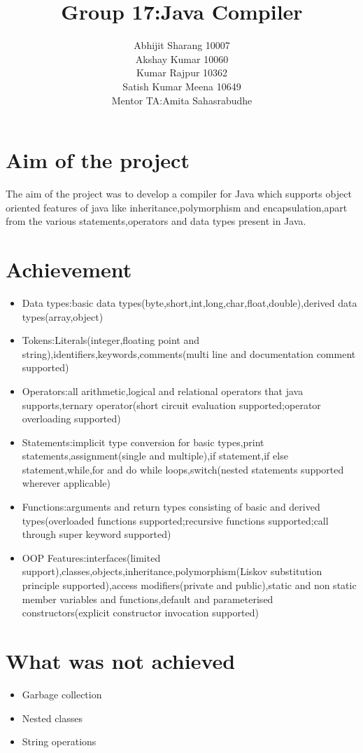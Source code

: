 \documentclass{report}
\title{Group 17:Java Compiler}
\author{Abhijit Sharang  10007\\
	Akshay Kumar 10060\\
	Kumar Rajpur 10362\\
	Satish Kumar Meena 10649\\
	Mentor TA:Amita Sahasrabudhe}
\date{}
\begin{document}
\maketitle
\vspace{-50mm}
\section*{Aim of the project}
The aim of the project was to develop a compiler for Java which supports object oriented features of java like inheritance,polymorphism and encapsulation,apart from the various statements,operators and data types present in Java.
\section*{Achievement}
\begin{itemize}
\item Data types:basic data types(byte,short,int,long,char,float,double),derived data types(array,object)
\item Tokens:Literals(integer,floating point and string),identifiers,keywords,comments(multi line and documentation comment supported)
\item Operators:all arithmetic,logical and relational operators that java supports,ternary operator(short circuit evaluation supported;operator overloading supported)
\item Statements:implicit type conversion for basic types,print statements,assignment(single and multiple),if statement,if else statement,while,for and do while loops,switch(nested statements supported wherever applicable)
\item Functions:arguments and return types consisting of basic and derived types(overloaded functions supported;recursive functions supported;call through super keyword supported)
\item OOP Features:interfaces(limited support),classes,objects,inheritance,polymorphism(Liskov substitution principle supported),access modifiers(private and public),static and non static member variables and functions,default and parameterised constructors(explicit constructor invocation supported)
\end{itemize}
\section*{What was not achieved}
\begin{itemize}
\item Garbage collection
\item Nested classes
\item String operations
\end{itemize}
\end{document}

